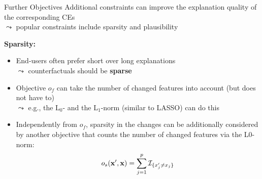 \documentclass[11pt,compress,t,notes=noshow, aspectratio=169, xcolor=table, usenames,dvipsnames]{beamer}
\begin{document}
\begin{frame}{Further Objectives}
	Additional constraints can improve the explanation quality of the corresponding CEs\\
	$\leadsto$ popular constraints include sparsity and plausibility
	
	\lz

	\textbf{Sparsity:}
	\begin{itemize}[<+->]
		\item End-users often prefer short over long explanations\\
		$\leadsto$ %
		counterfactuals should be \textbf{sparse} %
		\item Objective $o_f$ can take the number of changed features into account (but does not have to)\\
		$\leadsto$ e.g., the L$_0$- and the L$_1$-norm (similar to LASSO) can do this
        \item Independently from $o_f$, sparsity in the changes can be additionally considered by another objective that counts the number of changed features via the L0-norm:
        $$o_s(\xv', \xv) = \sum_{j = 1}^p {\Ind}_{\{ x'_j \neq x_j \}}$$
	\end{itemize}
\end{frame}
\end{document}
